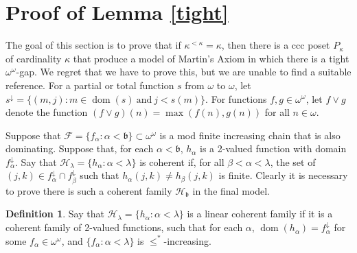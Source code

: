 \documentclass{amsart}
\theoremstyle{definition}
\newtheorem{definition}[thm]{Definition}
\theoremstyle{remark}
\def\dom{\operatorname{dom}}
\begin{document}
\section{Proof of Lemma \ref{tight}}

The goal of this section is to prove that if $\kappa^{<\kappa}=\kappa$,
then 
there is a ccc poset  $P_\kappa$
of cardinality $\kappa$ that produce a model of Martin's Axiom
in which there is a tight $\omega^\omega$-gap. We regret that
we have to prove this, but we are unable to find a suitable reference.
For a partial or total function $s$ from $\omega$ to $\omega$,
 let $s^{\downarrow} = \{ (m,j) : m\in\dom(s)\ \mbox{and}\ j< s(m)\}$.
 For functions $f,g\in \omega^\omega$, let $f\vee g$ denote
 the function $(f\vee g) (n)  = \max(f(n),g(n))$ for all $n\in\omega$.

Suppose that $\mathcal F = \{ f_\alpha : \alpha < \mathfrak b \}\subset \omega^\omega
$ is a mod finite increasing chain that is also dominating.
 Suppose that, for each $\alpha<\mathfrak b$, $h_\alpha$ is a 2-valued function
with domain $f_\alpha^\downarrow$. Say that $\mathcal H_\lambda
=\{ h_\alpha : \alpha < \lambda\}$ is coherent if, for all 
 $\beta < \alpha < \lambda$, the set of $(j,k)\in f_\alpha^\downarrow
 \cap f_\beta^\downarrow$ such that $h_\alpha( j,k)\neq h_\beta( j,k)$ is finite.
 Clearly it is necessary to prove there is such a coherent family
  $\mathcal H_{\mathfrak b}$ in the final model.

  

  \begin{definition}  Say that $\mathcal H_\lambda = \{ h_\alpha : \alpha < \lambda\}$ is a
   linear coherent family if it is a coherent family of 2-valued functions,
   such that
   for each $\alpha$, $\dom(h_\alpha) = f_\alpha^\downarrow$ for some $f_\alpha\in\omega^\omega$,
   and $\{ f_\alpha : \alpha < \lambda\}$ is  $\leq^*$-increasing.
  \end{definition}
\end{document}
